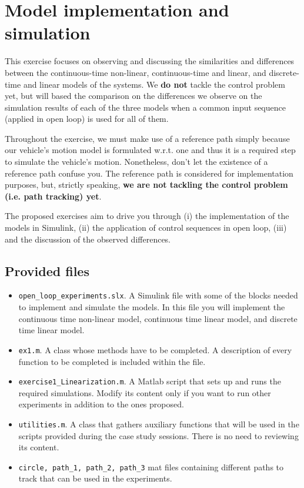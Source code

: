 \setcounter{chapter}{0}
\chapter{Model implementation and simulation}
\label{ch:implementation}

This exercise focuses on observing and discussing the similarities and differences between the continuous-time non-linear, continuous-time and linear, and discrete-time and linear models of the systems. 
We \textbf{do not} tackle the control problem yet, but will based the comparison on the differences we observe on the simulation results of each of the three models when a common input sequence (applied in open loop) is used for all of them.

Throughout the exercise, we must make use of a reference path simply because our vehicle's motion model is formulated w.r.t. one and thus it is a required step to simulate the vehicle's motion. 
Nonetheless, don't let the existence of a reference path confuse you.
The reference path is considered for implementation purposes, but, strictly speaking, \textbf{we are not tackling the control problem (i.e. path tracking) yet}. 

The proposed exercises aim to drive you through (i) the implementation of the models in Simulink, (ii) the application of control sequences in open loop, (iii) and the discussion of the observed differences. 
%
\section{Provided files}
\begin{itemize}
	\setlength\itemsep{0em}
	\item \texttt{open\_loop\_experiments.slx}.
		A Simulink file with some of the blocks needed to implement and simulate the models. 
		In this file you will implement the continuous time non-linear model, continuous time linear model, and discrete time linear model. 
	\item \texttt{ex1.m}.
		A class whose methods have to be completed.
		A description of every function to be completed is included within the file.
	\item \texttt{exercise1\_Linearization.m}.
		A Matlab script that sets up and runs the required simulations.
		Modify its content only if you want to run other experiments in addition to the ones proposed.
	\item \texttt{utilities.m}.
		A class that gathers auxiliary functions that will be used in the scripts provided during the case study sessions.
		There is no need to reviewing its content.
	\item \texttt{circle, path\_1, path\_2, path\_3}  mat files containing different paths to track that can be used in the experiments.
\end{itemize}		
%
